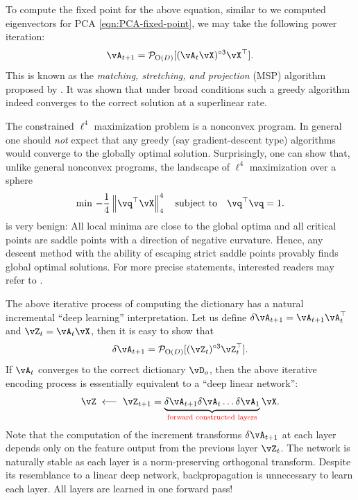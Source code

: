 \documentclass[../../book-main.tex]{subfiles}
\begin{document}
To compute the fixed point for the above equation, similar to we computed eigenvectors for PCA \eqref{eqn:PCA-fixed-point}, we may take the following power iteration:
\begin{equation}\label{eq:msp_iteration}
    \vA_{t+1} = \mathcal{P}_{\mathrm O(D)}[( {\vA_t \vX})^{\circ3}\vX^\top].
\end{equation}
This is known as the {\em matching, stretching, and projection} (MSP) algorithm proposed by \cite{Zhai-2020}. It was shown that under broad conditions such a greedy algorithm indeed converges to the correct solution at a superlinear rate.

\begin{remark}\label{rem:L4-global}
The constrained $\ell^4$ maximization problem is a nonconvex program. In general one should \textit{not} expect that any greedy (say gradient-descent type) algorithms would converge to the globally optimal solution. Surprisingly, one can show that, unlike general nonconvex programs, the landscape of $\ell^4$ maximization over a sphere
\begin{equation}\label{eq:l4-maximization-sphere}
    \min\,
    -   \frac{1}{4} \norm*{
    \vq^\top \vX
    }_4^4 \quad \mbox{subject to} \quad  \vq^\top\vq = 1.
\end{equation}
is very benign: All local minima are close to the global optima and all critical points are saddle points with a direction of negative curvature. Hence, any descent method with the ability of escaping strict saddle points provably finds global optimal solutions. For more precise statements, interested readers may refer to \cite{Qu2020Geometric}. 
\end{remark}

\begin{remark}
The above iterative process of computing the dictionary has a natural incremental ``deep learning'' interpretation. Let us define 
$\delta \vA_{t+1} = \vA_{t+1}\vA_{t}^\top$ and $\vZ_t = \vA_t \vX$, then it is easy to show that
$$\delta \vA_{t+1} = \mathcal{P}_{\mathrm O(D)}[(\vZ_t)^{\circ3} \vZ_t^\top].$$ 
If $\vA_t$ converges to the correct dictionary $\vD_o$, then the above iterative encoding process is essentially equivalent to a ``deep linear network'': 
$$\vZ \; \longleftarrow \; \vZ_{t+1} =  \underbrace{\delta \vA_{t+1} \delta \vA_{t} \ldots \delta \vA_{1}}_{\color{red} \text{forward constructed layers}} \vX.$$
Note that the computation of the increment transforms $\delta \vA_{t+1}$ at each layer depends only on the feature output from the previous layer $\vZ_t$. The network is naturally stable as each layer is a norm-preserving orthogonal transform. Despite its resemblance to a linear deep network, backpropagation is unnecessary to learn each layer. All layers are learned in one forward pass!
\end{remark}
\end{document}
